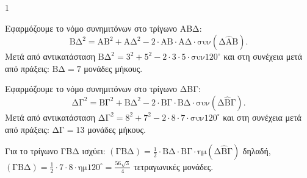 \begin{ylh}{1}
    \item [ΛΥΣΗ]
\end{ylh}
\begin{alist}
    \item Εφαρμόζουμε το νόμο συνημιτόνων στο τρίγωνο ΑΒΔ:
    \[ \text{ΒΔ}^2 = \text{ΑΒ}^2 + \text{ΑΔ}^2 - 2 \cdot \text{ΑΒ} \cdot \text{ΑΔ} \cdot \text{συν}(\text{Δ}\hat{\text{Α}}\text{Β}). \]
    Μετά από αντικατάσταση $\text{ΒΔ}^2 = 3^2 + 5^2 - 2 \cdot 3 \cdot 5 \cdot \text{συν}120^\circ$ και στη συνέχεια μετά από πράξεις: $\text{ΒΔ} = 7$ μονάδες μήκους.
    
    \item Εφαρμόζουμε το νόμο συνημιτόνων στο τρίγωνο ΔΒΓ:
    \[ \text{ΔΓ}^2 = \text{ΒΓ}^2 + \text{ΒΔ}^2 - 2 \cdot \text{ΒΓ} \cdot \text{ΒΔ} \cdot \text{συν}(\text{Δ}\hat{\text{Β}}\text{Γ}). \]
    Μετά από αντικατάσταση $\text{ΔΓ}^2 = 8^2 + 7^2 - 2 \cdot 8 \cdot 7 \cdot \text{συν}120^\circ$ και στη συνέχεια μετά από πράξεις: $\text{ΔΓ} = 13$ μονάδες μήκους.
    
    \item Για το τρίγωνο ΓΒΔ ισχύει: $(\text{ΓΒΔ}) = \frac{1}{2} \cdot \text{ΒΔ} \cdot \text{ΒΓ} \cdot \text{ημ}(\text{Δ}\hat{\text{Β}}\text{Γ})$ δηλαδή, $(\text{ΓΒΔ}) = \frac{1}{2} \cdot 7 \cdot 8 \cdot \text{ημ}120^\circ = \frac{56\sqrt{3}}{4}$ τετραγωνικές μονάδες.
\end{alist}